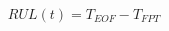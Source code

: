 \documentclass[xcolor=dvipsnames, professionalfonts, aspectratio=169, 11pt]{beamer}
\begin{document}
\begin{persian}
\begin{frame}
\begin{multicols}{2}
		\begin{eqnarray}
		RUL(t)=T_{EOF} - T_{FPT}
		\end{eqnarray}
		
		
	\end{multicols}
	


%
%
%		
%	
	
	
	

\end{frame}
\end{persian}
\end{document}
